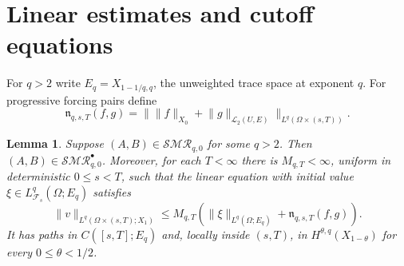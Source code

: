 \documentclass[11pt]{amsart}
\newtheorem{lemma}[theorem]{Lemma}
\theoremstyle{definition}
\theoremstyle{remark}
\newcommand{\SMR}{\mathcal{SMR}}
\newcommand{\HS}{\mathcal L_2(U,E)}
\newcommand{\norm}[2][]{\lVert #2\rVert_{#1}}
\numberwithin{equation}{section}
\begin{document}
\section{Linear estimates and cutoff equations}

For $q>2$ write $E_q=X_{1-1/q,q}$, the unweighted trace space at
exponent $q$. For progressive forcing pairs define
\[
 \mathfrak n_{q,s,T}(f,g)=
 \bigl\|\norm[X_0]{f}+\norm[\HS]{g}\bigr\|_{L^q(\Omega\times(s,T))}.
\]

\begin{lemma}\label{lem:linear}
Suppose $(A,B)\in\SMR_{q,0}$ for some $q>2$. Then
$(A,B)\in\SMR^\bullet_{q,0}$. Moreover, for each $T<\infty$ there
is $M_{q,T}<\infty$, uniform in deterministic $0\le s<T$, such that
the linear equation with initial value
$\xi\in L^q_{\mathcal F_s}(\Omega;E_q)$ satisfies
\begin{equation}\label{eq:initialestimate}
 \norm[L^q(\Omega\times(s,T);X_1)]{v}
 \le M_{q,T}\left(\norm[L^q(\Omega;E_q)]{\xi}
                         +\mathfrak n_{q,s,T}(f,g)\right).
\end{equation}
It has paths in $C([s,T];E_q)$ and, locally inside $(s,T)$, in
$H^{\theta,q}(X_{1-\theta})$ for every $0\le\theta<1/2$.
\end{lemma}
\end{document}
